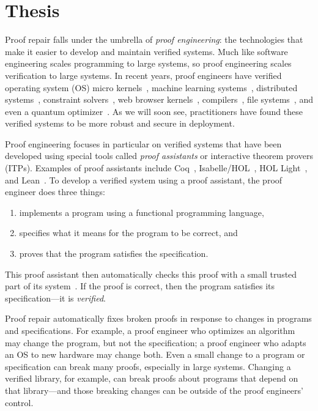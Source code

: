 \section{Thesis}

Proof repair falls under the umbrella of \textit{proof engineering}: the technologies that make it easier
to develop and maintain verified systems.
Much like software engineering scales programming to large systems, so proof engineering scales verification to large systems. 
In recent years, proof engineers have verified operating system (OS) micro kernels~\cite{Klein2009, Klein2014micro}, machine learning systems~\cite{TODO}, distributed systems~\cite{TODO}, constraint solvers~\cite{TODO}, web browser kernels~\cite{TODO}, compilers~\cite{Leroy:POPL06, Leroy2009}, file systems~\cite{TODO}, and even a quantum optimizer~\cite{TODO}.
As we will soon see, practitioners have found these verified systems to be more robust and secure in deployment. %

Proof engineering focuses in particular on verified systems that have been
developed using special tools called \textit{proof assistants} or interactive theorem provers (ITPs).
Examples of proof assistants include Coq~\cite{coq}, Isabelle/HOL~\cite{isabelle}, 
HOL Light~\cite{hollight}, and Lean~\cite{lean}.
To develop a verified system using a proof assistant, the proof engineer does three things:

\begin{enumerate}
\item implements a program using a functional programming language,
\item specifies what it means for the program to be correct, and
\item proves that the program satisfies the specification.
\end{enumerate}
This proof assistant then automatically checks this proof with a small trusted part of its system~\cite{Barendregt2002,Barendregt2351}.
If the proof is correct, then the program satisfies its specification---it is \textit{verified}.

Proof repair automatically fixes broken proofs in response to changes in programs and specifications.
For example, a proof engineer who optimizes an algorithm may change the program, but not the specification; a proof engineer who adapts an OS to new hardware may change both. Even a small change to a program or specification can break many proofs, especially in large systems.
Changing a verified library, for example, can break proofs about programs that depend on that library---and those breaking changes
can be outside of the proof engineers' control.

